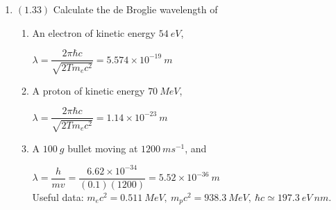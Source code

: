 \documentclass[fleqn]{article}
\begin{document}
\begin{enumerate}
\begin{enumerate}
        \item The angle at which the electrons recoil.

          \textcolor{hwColor}{
            $
              p_{photon}=\dfrac{h}{\lambda}=\dfrac{6.62 \times 10^{-34} ~ Js}{0.0017 \times 10^{-9} m}=3.90 \times 10^{-22}=3.89 \times 10^{-22} \\
              \\
              p=mv \rightarrow p=m\sqrt{\dfrac{2KE}{m}}=9.11 \times 10^{-31} \sqrt{\dfrac{1.315 \times 10^{-13} Js}{9.11 \times 10^{-31} ~ kg}} \\
              \\
              p=4.90 \times 10^{-22} ~ kgm/s \\
              \\
              p_{electron}=p \Rightarrow 4.90 \times 10^{-22} ~ sin(\theta)=3.89 \times 10^{-22} ~ sin(48) \\
              \\
              \Longrightarrow \theta \approx 36.24^{\circ}
            $
          }

      \end{enumerate}

    \item $(\mathbf{1.33})$ Calculate the de Broglie wavelength of
      \begin{enumerate}
        \item An electron of kinetic energy $54 ~ eV$,

          \textcolor{hwColor}{
            $
              \lambda=\dfrac{2\pi \hbar c}{\sqrt{2Tm_e c^2}}=5.574 \times 10^{-19} ~ m
            $
          }

        \item A proton of kinetic energy $70 ~ MeV$,
        
          \textcolor{hwColor}{
            $
            \lambda=\dfrac{2\pi \hbar c}{\sqrt{2Tm_e c^2}}=1.14 \times 10^{-23} ~ m
            $
          }

        \item A $100 ~ g$ bullet moving at $1200 ~ ms^{-1}$, and
         
          \textcolor{hwColor}{
            $
              \lambda=\dfrac{h}{mv}=\dfrac{6.62 \times 10^{-34} }{(0.1)(1200)}=5.52 \times 10^{-36} ~ m
            $
          } \\


        Useful data: $m_ec^2=0.511 ~ MeV, ~ m_pc^2=938.3 ~ MeV, ~ \hbar c \simeq 197.3 ~ eV ~ nm$.
      \end{enumerate}

  \end{enumerate}
\end{document}
